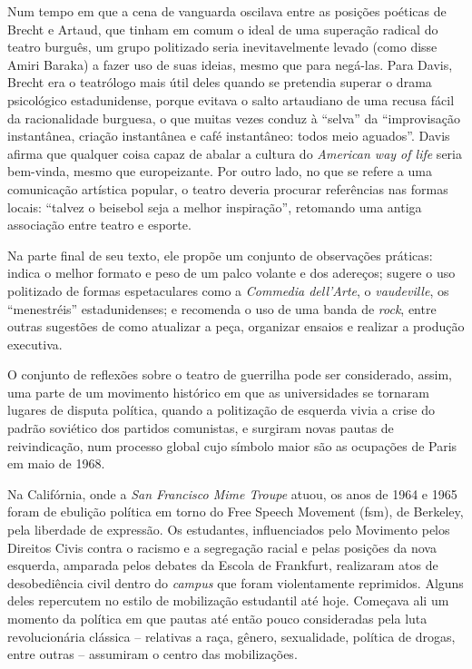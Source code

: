 Num tempo em que a cena de vanguarda oscilava entre as posições poéticas
de Brecht e Artaud, que tinham em comum o ideal de uma superação radical
do teatro burguês, um grupo politizado seria inevitavelmente levado
(como disse Amiri Baraka) a fazer uso de suas ideias, mesmo que para
negá-las. Para Davis, Brecht era o teatrólogo mais útil deles quando se
pretendia superar o drama psicológico estadunidense, porque evitava o
salto artaudiano de uma recusa fácil da racionalidade burguesa, o que
muitas vezes conduz à “selva” da “improvisação instantânea, criação
instantânea e café instantâneo: todos meio aguados”. Davis afirma que
qualquer coisa capaz de abalar a cultura do {\it American way of life}
seria bem-vinda, mesmo que europeizante. Por outro lado, no que se refere
a uma comunicação artística popular, o teatro deveria procurar
referências nas formas locais: “talvez o beisebol seja a melhor
inspiração”, retomando uma antiga associação entre teatro e esporte.

Na parte final de seu texto, ele propõe um conjunto de observações
práticas: indica o melhor formato e peso de um palco volante e dos
adereços; sugere o uso politizado de formas espetaculares como a
{\it Commedia dell'Arte}, o {\it vaudeville}, os “menestréis”
estadunidenses; e recomenda o uso de uma banda de {\it rock}, entre
outras sugestões de como atualizar a peça, organizar ensaios e
realizar a produção executiva.

O conjunto de reflexões sobre o teatro de guerrilha pode ser
considerado, assim, uma parte de um movimento histórico em que as
universidades se tornaram lugares de disputa política, quando a
politização de esquerda vivia a crise do padrão soviético dos partidos
comunistas, e surgiram novas pautas de reivindicação, num processo
global cujo símbolo maior são as ocupações de Paris em maio de 1968.

Na Califórnia, onde a {\it San Francisco Mime Troupe} atuou, os anos de
1964 e 1965 foram de ebulição política em torno do Free Speech
Movement ({\sc fsm}), de Berkeley, pela liberdade de expressão. Os estudantes,
influenciados pelo Movimento pelos Direitos Civis contra o racismo e a
segregação racial e pelas posições da nova esquerda, amparada pelos
debates da Escola de Frankfurt, realizaram atos de desobediência civil
dentro do {\it campus} que foram violentamente reprimidos. Alguns deles
repercutem no estilo de mobilização estudantil até hoje. Começava ali um
momento da política em que pautas até então pouco consideradas pela luta
revolucionária clássica -- relativas a raça, gênero, sexualidade,
política de drogas, entre outras -- assumiram o centro das mobilizações.


